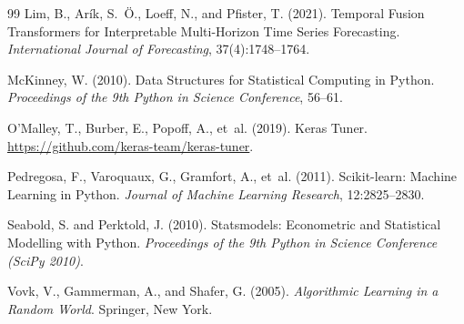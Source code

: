 \documentclass[12pt,a4paper]{article}
\begin{document}
\begin{thebibliography}{99}
Lim, B., Ar{\'i}k, S.~{\"O}., Loeff, N., and Pfister, T. (2021).
\newblock Temporal Fusion Transformers for Interpretable Multi-Horizon Time Series Forecasting.
\newblock \emph{International Journal of Forecasting}, 37(4):1748--1764.

McKinney, W. (2010).
\newblock Data Structures for Statistical Computing in Python.
\newblock \emph{Proceedings of the 9th Python in Science Conference}, 56--61.

O'Malley, T., Burber, E., Popoff, A., et~al. (2019).
\newblock Keras Tuner.
\newblock \url{https://github.com/keras-team/keras-tuner}.

Pedregosa, F., Varoquaux, G., Gramfort, A., et~al. (2011).
\newblock Scikit-learn: Machine Learning in Python.
\newblock \emph{Journal of Machine Learning Research}, 12:2825--2830.

Seabold, S. and Perktold, J. (2010).
\newblock Statsmodels: Econometric and Statistical Modelling with Python.
\newblock \emph{Proceedings of the 9th Python in Science Conference (SciPy 2010)}.

Vovk, V., Gammerman, A., and Shafer, G. (2005).
\newblock \emph{Algorithmic Learning in a Random World}.
\newblock Springer, New York.

\end{thebibliography}
\end{document}
